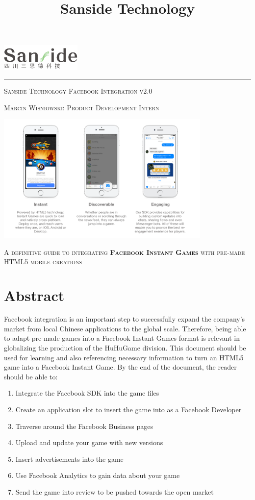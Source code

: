 \documentclass{article}
\begin{document}
\title{Sanside Technology}
\begin{titlepage}
    \includegraphics[width = 150px]{images/SansideLogo.png}
    \hfill
    \hrule
    \vspace{2cm}
    \centering
	{\scshape\LARGE Sanside Technology Facebook Integration v2.0\par}
	\vspace{0.5cm}
	{\scshape Marcin Wisniowski: Product Development Intern \par}
    \vspace{2cm}
    \begin{center}
    \includegraphics[width = 400px]{images/Facebook.png}
    \end{center}
    \vspace{0.5cm}
    {\scshape A definitive guide to integrating \textbf{Facebook Instant Games} with pre-made HTML5 mobile creations}
\end{titlepage}

\section{Abstract}
Facebook integration is an important step to successfully expand the company's market from local Chinese applications to the global scale. Therefore, being able to adapt pre-made games into a Facebook Instant Games format is relevant in globalizing the production of the HuHuGame division. This document should be used for learning and also referencing necessary information to turn an HTML5 game into a Facebook Instant Game. By the end of the document, the reader should be able to:
\begin{enumerate}
\item Integrate the Facebook SDK into the game files
\item Create an application slot to insert the game into as a Facebook Developer
\item Traverse around the Facebook Business pages
\item Upload and update your game with new versions
\item Insert advertisements into the game
\item Use Facebook Analytics to gain data about your game
\item Send the game into review to be pushed towards the open market
\end{enumerate}
\end{document}
